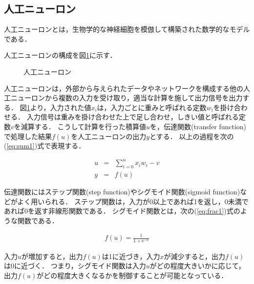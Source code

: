 \documentclass[a4j,12pt,dvipdfmx]{jreport}
\begin{document}
\subsection{人工ニューロン}
人工ニューロンとは，生物学的な神経細胞を模倣して構築された数学的なモデルである．

人工ニューロンの構成を図\ref{fig:neuron}に示す．

\begin{figure}[b]
  \centering
  \caption{人工ニューロン}
  \label{fig:neuron}
\end{figure}

人工ニューロンは，外部から与えられたデータやネットワークを構成する他の人工ニューロンから複数の入力を受け取り，適当な計算を施して出力信号を出力する．
図\ref{fig:neuron}より，入力された値$x_i$は，入力ごとに重みと呼ばれる定数$w_i$を掛け合わせる．
入力信号は重みを掛け合わせた上で足し合わせ，しきい値と呼ばれる定数$v$を減算する．
こうして計算を行った積算値$u$を，伝達関数(transfer function)で処理した結果$f(u)$を人工ニューロンの出力$y$とする．
以上の過程を次の(\ref{eq:sum1})式で表現する．


\begin{eqnarray}
  \label{eq:sum1}
  u &=& \sum_{i=0}^n x_i w_i - v \nonumber \\
  y &=& f(u)
\end{eqnarray}

伝達関数にはステップ関数(step function)やシグモイド関数(sigmoid function)などがよく用いられる．
ステップ関数は，入力が0以上であれば1を返し，0未満であれば0を返す非線形関数である．
シグモイド関数とは，次の(\ref{eq:frac1})式のような関数である．

\begin{eqnarray}
  \label{eq:frac1}
  f(u) = \frac{1}{1 + \mathrm{e}^{-u}}
\end{eqnarray}

入力$u$が増加すると，出力$f(u)$は1に近づき，入力$x$が減少すると，出力$f(u)$は0に近づく．
つまり，シグモイド関数は入力$u$がどの程度大きいかに応じて，出力$f(u)$がどの程度大きくなるかを制御することが可能となっている．
\end{document}
